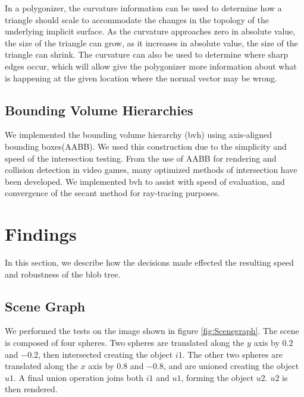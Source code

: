 \documentclass[conference]{acmsiggraph}
\begin{document}
In a polygonizer, the curvature information can be used to determine how a
triangle should scale to accommodate the changes in the topology of the
underlying implicit surface. As the curvature approaches zero in absolute value,
the size of the triangle can grow, as it increases in absolute value, the size
of the triangle can shrink. The curvature can also be used to determine where
sharp edges occur, which will allow give the polygonizer more information about
what is happening at the given location where the normal vector may be wrong.

\subsection{Bounding Volume Hierarchies}
We implemented the bounding volume hierarchy (bvh) using axis-aligned bounding
boxes(AABB). We used this construction due to the simplicity and speed of the
intersection testing. From the use of AABB for rendering and collision
detection in video games, many optimized methods of intersection have been
developed\cite{Williams}. We implemented bvh to assist with speed of
evaluation, and convergence of the secant method for ray-tracing purposes.

\section{Findings}
In this section, we describe how the decisions made effected the resulting
speed and robustness of the blob tree.

\subsection{Scene Graph}

We performed the tests on the image shown in figure \ref{fig:Scenegraph}. The
scene is composed of four spheres. Two spheres are translated along the $y$
axis by $0.2$ and $-0.2$, then intersected creating the object $i1$. The other
two spheres are translated along the $x$ axis by $0.8$ and $-0.8$, and are
unioned creating the object $u1$. A final union operation joins both $i1$ and
$u1$, forming the object $u2$. $u2$ is then rendered.
\end{document}
